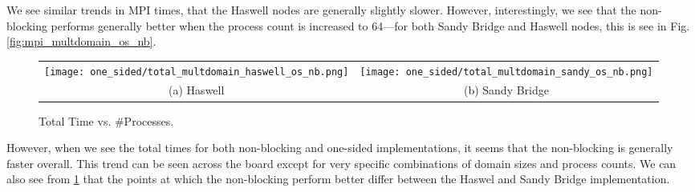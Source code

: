\begin{enumerate}
	We see similar trends in MPI times, that the Haswell nodes are generally slightly slower. 
	However, interestingly, we see that the non-blocking performs generally better when the process count is increased to 64---for both Sandy Bridge and Haswell nodes, this is see in Fig. \ref{fig:mpi_multdomain_os_nb}.
			\begin{figure}[h] %
		\hspace*{-0.25\linewidth}\begin{tabular}{cc}
			\texttt{[image: one\_sided/total\_multdomain\_haswell\_os\_nb.png]} & \texttt{[image: one\_sided/total\_multdomain\_sandy\_os\_nb.png]} \\
			(a) Haswell &  (b) Sandy Bridge\\[6pt]
		\end{tabular}
		\caption{Total Time vs. \#Processes.}
		\label{fig:total_multdomain_os_nb}
	\end{figure}
	
	However, when we see the total times for both non-blocking and one-sided implementations, it seems that the non-blocking is generally faster overall.
	This trend can be seen across the board except for very specific combinations of domain sizes and process counts. 
	We can also see from \ref{fig:total_multdomain_os_nb} that the points at which the non-blocking perform better differ between the Haswel and Sandy Bridge implementation.


\end{enumerate}
